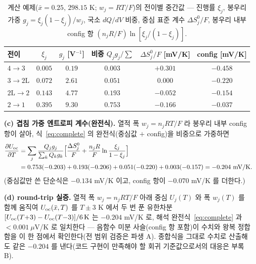 \begin{table}[htbp]
\centering\small
\renewcommand{\arraystretch}{1.2}
\caption{계산 예제($\bar x{=}0.25$, $298.15$ K; $w_j{=}RT/F$)의 전이별 중간값 --- 진행률 $\xi_j$, 봉우리 가중
$g_j=\xi_j(1-\xi_j)/w_j$, 국소 $dQ/dV$ 비중, 중심 표준 계수 $\Delta S^0_j/F$, 봉우리 내부 config 항
$(n_jR/F)\ln[\xi_j/(1-\xi_j)]$.}
\label{tab:worked}
\begin{tabular}{lccccc}
\toprule
전이 & $\xi_j$ & $g_j$ [V$^{-1}$] & 비중 $Q_jg_j/\!\sum$ & $\Delta S^0_j/F$ [mV/K] & config [mV/K] \\
\midrule
$4\!\to\!3$   & $0.005$ & $0.19$ & $0.003$ & $+0.301$ & $-0.458$ \\
$3\!\to\!2\mathrm L$ & $0.072$ & $2.61$ & $0.051$ & $0.000$ & $-0.220$ \\
$2\mathrm L\!\to\!2$ & $0.143$ & $4.77$ & $0.193$ & $-0.052$ & $-0.154$ \\
$2\!\to\!1$   & $0.395$ & $9.30$ & $0.753$ & $-0.166$ & $-0.037$ \\
\bottomrule
\end{tabular}
\end{table}

\textbf{(c) 겹침 가중 엔트로피 계수(완전식).} 열적 폭 $w_j{=}n_jRT/F$ 라 봉우리 내부 config 항이 살아,
식~\eqref{eq:complete} 의 완전식(중심값 $+$ config)을 비중으로 가중하면
\begin{equation*}
\begin{aligned}
\frac{\partial U_{\mathrm{oc}}}{\partial T}
&=\sum_j\frac{Q_jg_j}{\sum_kQ_kg_k}\Big[\frac{\Delta S^0_j}{F}+\frac{n_jR}{F}\ln\frac{\xi_j}{1-\xi_j}\Big]\\
&=0.753(-0.203)+0.193(-0.206)+0.051(-0.220)+0.003(-0.157)
=-0.204\ \mathrm{mV/K}.
\end{aligned}
\end{equation*}
(중심값만 쓴 단순식은 $-0.134$ mV/K 이고, config 항이 $-0.070$ mV/K 를 더한다.)

\textbf{(d) round-trip 실증.} 열적 폭 $w_j{=}n_jRT/F$ 아래 중심 $U_j(T)$ 와 폭 $w_j(T)$ 를 함께 움직여
$U_{\mathrm{oc}}(\bar x,T)$ 를 $T\pm3$ K 에서 두 번 푼 유한차분 $[U_{\mathrm{oc}}(T{+}3)-U_{\mathrm{oc}}(T{-}3)]/6\,\mathrm K$ 는 $-0.204$
mV/K 로, 해석 완전식~\eqref{eq:complete} 과 $<\!0.001\ \mu$V/K 로 일치한다 --- 음함수 미분 사슬(config 항
포함)이 수치와 왕복 정합함을 이 한 점에서 확인한다(전 범위 검증은 파생 A). 종합식을 그대로 수치로 산출해도
같은 $-0.204$ 를 낸다(코드 구현이 만족해야 할 회귀 기준값으로서의 대응은 부록 B).

